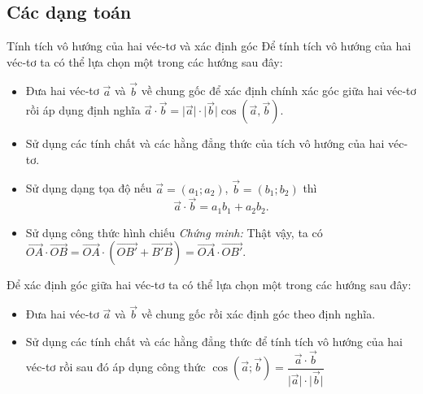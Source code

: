 \subsection{Các dạng toán}	
\begin{dang}{Tính tích vô hướng của hai véc-tơ và xác định góc}	
	Để tính tích vô hướng của hai véc-tơ ta có thể lựa chọn một trong các hướng sau đây:
	\begin{itemize}
		\item Đưa hai véc-tơ $ \overrightarrow{a} $ và $ \overrightarrow{b} $ về chung gốc để xác định chính xác góc giữa hai véc-tơ rồi áp dụng định nghĩa $\overrightarrow{a}\cdot \overrightarrow{b}=\big|\overrightarrow{a}\big|\cdot \big|\overrightarrow{b}\big|\cos\left(\overrightarrow{a},\overrightarrow{b}\right).$
		\item Sử dụng các tính chất và các hằng đẳng thức của tích vô hướng của hai véc-tơ.
		\item Sử dụng dạng tọa độ nếu $\overrightarrow{a}=(a_1;a_2)$, $\overrightarrow{b}=(b_1;b_2)$ thì \[ \overrightarrow{a}\cdot \overrightarrow{b}=a_1b_1+a_2b_2.\]
		\item Sử dụng công thức hình chiếu
		\textit{Chứng minh:} Thật vậy, ta có  $ \overrightarrow{OA}\cdot \overrightarrow{OB}=\overrightarrow{OA}\cdot \left (\overrightarrow{OB'}+\overrightarrow{B'B}\right )=\overrightarrow{OA}\cdot \overrightarrow{OB'} $.
	\end{itemize}
	Để xác định góc giữa hai véc-tơ ta có thể lựa chọn một trong các hướng sau đây:
	\begin{itemize}
		\item Đưa hai véc-tơ $ \overrightarrow{a} $ và $ \overrightarrow{b} $ về chung gốc rồi xác định góc theo định nghĩa.
		\item Sử dụng các tính chất và các hằng đẳng thức để tính tích vô hướng của hai véc-tơ rồi sau đó áp dụng công thức $ \cos \left (\overrightarrow{a};\overrightarrow{b}\right )=\dfrac{\overrightarrow{a}\cdot \overrightarrow{b}}{\big|\overrightarrow{a}\big|\cdot \big|\overrightarrow{b}\big|} $

\end{itemize}
\end{dang}
